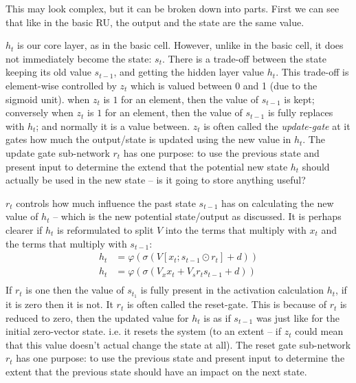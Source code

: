 \documentclass[12pt,parskip]{komatufte}
\begin{document}

This may look complex, but it can be broken down into parts.
First we can see that like in the basic RU, the output and the state are the same value.

$h_t$ is our core layer, as in the basic cell.
However, unlike in the basic cell, it does not immediately become the state: $s_t$.
There is a trade-off between the state keeping its old value $s_{t-1}$, and getting the hidden layer value $h_t$.
This trade-off is element-wise controlled by $z_t$ which is valued between 0 and 1 (due to the sigmoid unit).
when $z_t$ is $1$ for an element, then the value of $s_{t-1}$ is kept;
conversely when $z_t$ is $1$ for an element, then the value of $s_{t-1}$ is fully replaces with $h_t$;
and normally it is a value between.
$z_t$ is often called the \emph{update-gate} at it gates how much the output/state is updated using the new value in $h_t$.
The update gate sub-network $r_t$ has one purpose: to use the previous state and present input to determine the extend that the potential new state $h_t$ should actually be used in the new state -- is it going to store anything useful?

$r_t$ controls how much influence the past state $s_{t-1}$ has on calculating the new value of $h_t$ -- which is the new potential state/output as discussed.
It is perhaps clearer if $h_t$ is reformulated to split $V$ into the terms that multiply with $x_t$ and the terms that multiply with $s_{t-1}$:
\begin{align}
h_t &= \varphi \left( \sigma \left( V[x_t; s_{t-1} \odot r_t] + d \right) \right) \\
h_t &= \varphi \left( \sigma \left( V_x x_t + V_s r_t s_{t-1} + d \right) \right) \\
\end{align}
If $r_t$ is one then the value of $s_{t_1}$ is fully present in the activation calculation $h_t$, if it is zero then it is not.
It $r_t$ is often called the reset-gate.
This is because of $r_t$ is reduced to zero, then the updated value for $h_t$ is as if $s_{t-1}$ was just like for the initial zero-vector state.
i.e. it resets the system (to an extent -- if $z_t$ could mean that this value doesn't actual change the state at all).
The reset gate sub-network $r_t$ has one purpose: to use the previous state and present input to determine the extent that the previous state should have an impact on the next state.
\end{document}
